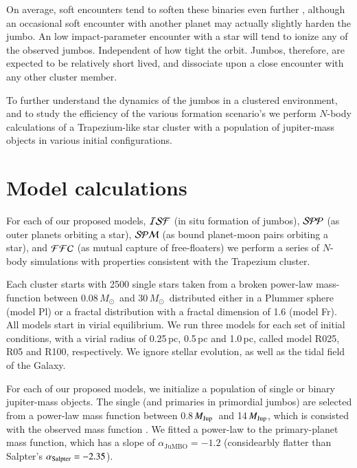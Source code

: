 \documentclass[aa]{lib/aa}
\newcommand{\MSun}{\mbox{${M}_\odot$}}
\newcommand{\MJup}{\mbox{${M}_{\rm Jup}$}}
\newcommand{\jumbo}{\mbox{JuMBO}}
\begin{document}
On average, soft encounters tend to soften these binaries even further
\citep{1975MNRAS.173..729H}, although an occasional soft encounter
with another planet may actually slightly harden the jumbo.  An low
impact-parameter encounter with a star will tend to ionize any of the
observed jumbos.  Independent of how tight the orbit.  Jumbos,
therefore, are expected to be relatively short lived, and dissociate
upon a close encounter with any other cluster member.

To further understand the dynamics of the jumbos in a clustered
environment, and to study the efficiency of the various formation
scenario's we perform $N$-body calculations of a Trapezium-like star
cluster with a population of jupiter-mass objects in various initial
configurations.

\section{Model calculations}

For each of our proposed models, ${\cal ISF}$ (in situ formation of
jumbos), ${\cal SPP}$ (as outer planets orbiting a star), ${\cal SPM}$
(as bound planet-moon pairs orbiting a star), and ${\cal FFC}$ (as
mutual capture of free-floaters) we perform a series of $N$-body
simulations with properties consistent with the Trapezium cluster.

Each cluster starts with 2500 single stars taken from a broken
power-law mass-function \citep{2002Sci...295...82K} between
0.08\,\MSun\, and $30$\,\MSun\, distributed either in a Plummer sphere
(model Pl) or a fractal distribution with a fractal dimension of 1.6
(model Fr). All models start in virial equilibrium.  We run three
models for each set of initial conditions, with a virial radius of
0.25\,pc, 0.5\,pc and 1.0\,pc, called model R025, R05 and R100,
respectively.  We ignore stellar evolution, as well as the tidal field
of the Galaxy.

For each of our proposed models, we initialize a population of single
or binary jupiter-mass objects. The single (and primaries in
primordial jumbos) are selected from a power-law mass function between
0.8\,\MJup\, and 14\,\MJup, which is consisted with the observed mass
function \citep{2023arXiv231001231P}. We fitted a power-law to the
primary-planet mass function, which has a slope of $\alpha_{\jumbo}
=-1.2$ (considearbly flatter than Salpter's $\alpha_{\rm Salpter} =
-2.35$).
\end{document}
